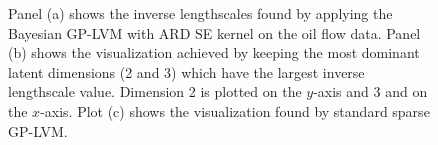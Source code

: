 %



\begin{figure}[ht]
\begin{center}
\end{center}
\caption{\small{
 Panel (a) shows the inverse lengthscales found by applying the
  Bayesian GP-LVM with ARD SE kernel on the oil flow data. Panel (b)
  shows the visualization achieved by keeping the most dominant latent
  dimensions (2 and 3) which have the largest inverse lengthscale
  value. Dimension 2 is plotted on the
  $y$-axis and 3 and on the $x$-axis. Plot (c) shows the visualization found
  by standard sparse GP-LVM.
}
}
\label{fig:oil}
\end{figure}

